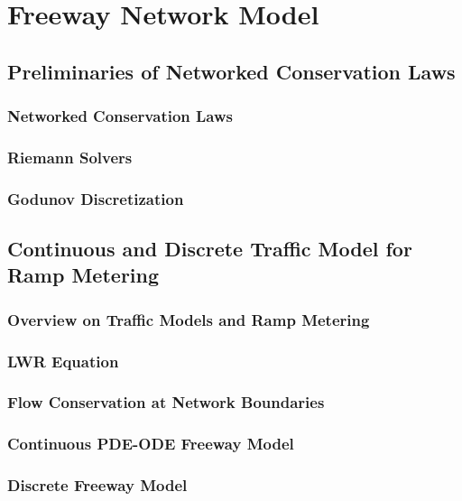\chapter{Freeway Network Model}
\label{chapter:freeway-network-model}

\section{Preliminaries of Networked Conservation Laws}

\subsection{Networked Conservation Laws}

\subsection{Riemann Solvers}

\subsection{Godunov Discretization}

\section{Continuous and Discrete Traffic Model for Ramp Metering}
\label{sec:continous-and-discrete-traffic-model-for-ramp-metering}

\subsection{Overview on Traffic Models and Ramp Metering}

\subsection{LWR Equation}

\subsection{Flow Conservation at Network Boundaries}

\subsection{Continuous PDE-ODE Freeway Model}

\subsection{Discrete Freeway Model}